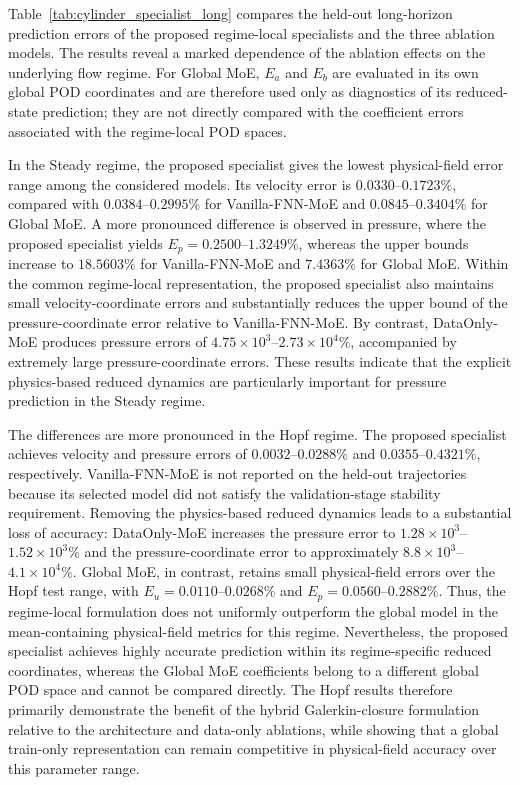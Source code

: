 Table~\ref{tab:cylinder_specialist_long} compares the held-out
long-horizon prediction errors of the proposed regime-local specialists and
the three ablation models. The results reveal a marked dependence of the
ablation effects on the underlying flow regime. For Global MoE,
$E_a$ and $E_b$ are evaluated in its own global POD coordinates and are
therefore used only as diagnostics of its reduced-state prediction; they are
not directly compared with the coefficient errors associated with the
regime-local POD spaces.

In the Steady regime, the proposed specialist gives the lowest
physical-field error range among the considered models. Its velocity error is
$0.0330$--$0.1723\%$, compared with $0.0384$--$0.2995\%$ for
Vanilla-FNN-MoE and $0.0845$--$0.3404\%$ for Global MoE. A more pronounced
difference is observed in pressure, where the proposed specialist yields
$E_p=0.2500$--$1.3249\%$, whereas the upper bounds increase to
$18.5603\%$ for Vanilla-FNN-MoE and $7.4363\%$ for Global MoE.
Within the common regime-local representation, the proposed specialist also
maintains small velocity-coordinate errors and substantially reduces the
upper bound of the pressure-coordinate error relative to Vanilla-FNN-MoE.
By contrast, DataOnly-MoE produces pressure errors of
$4.75\times10^{3}$--$2.73\times10^{4}\%$, accompanied by extremely large
pressure-coordinate errors. These results indicate that the explicit
physics-based reduced dynamics are particularly important for pressure
prediction in the Steady regime. 


The differences are more pronounced in the Hopf regime. The proposed
specialist achieves velocity and pressure errors of
$0.0032$--$0.0288\%$ and $0.0355$--$0.4321\%$, respectively.
Vanilla-FNN-MoE is not reported on the held-out trajectories because its
selected model did not satisfy the validation-stage stability requirement.
Removing the physics-based reduced dynamics leads to a substantial loss of
accuracy: DataOnly-MoE increases the pressure error to
$1.28\times10^{3}$--$1.52\times10^{3}\%$ and the pressure-coordinate error
to approximately $8.8\times10^{3}$--$4.1\times10^{4}\%$. Global MoE, in contrast, retains small physical-field errors over the Hopf
test range, with $E_u=0.0110$--$0.0268\%$ and
$E_p=0.0560$--$0.2882\%$. Thus, the regime-local formulation does not
uniformly outperform the global model in the mean-containing physical-field
metrics for this regime. Nevertheless, the proposed specialist achieves
highly accurate prediction within its regime-specific reduced coordinates,
whereas the Global MoE coefficients belong to a different global POD space
and cannot be compared directly. The Hopf results therefore primarily
demonstrate the benefit of the hybrid Galerkin-closure formulation relative
to the architecture and data-only ablations, while showing that a global
train-only representation can remain competitive in physical-field accuracy
over this parameter range.



